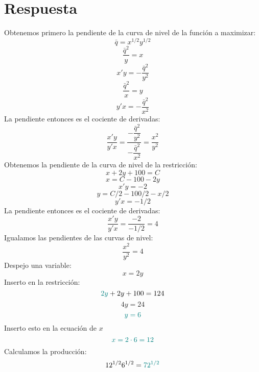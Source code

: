 \documentclass{article}
\begin{document}
\section*{Respuesta}
Obtenemos primero la pendiente de la curva de nivel de la función a maximizar:
\begin{equation*}
\bar{q}=x^{1/2}y^{1/2}
\end{equation*}
\begin{equation*}
\dfrac{\bar{q}^2}{y}=x
\end{equation*}
\begin{equation*}
x'y= -\dfrac{\bar{q}^2}{y^2}
\end{equation*}
\begin{equation*}
\dfrac{\bar{q}^2}{x}=y
\end{equation*}
\begin{equation*}
y'x= -\dfrac{\bar{q}^2}{x^2}
\end{equation*}
La pendiente entonces es el cociente de derivadas:
\begin{equation*}
\dfrac{x'y}{y'x}=\dfrac{-\dfrac{\bar{q}^2}{y^2}}{ -\dfrac{\bar{q}^2}{x^2}}=\dfrac{x^2}{y^2}
\end{equation*}
Obtenemos la pendiente de la curva de nivel de la restricción:
\begin{equation*}
x+2y+100=C
\end{equation*}
\begin{equation*}
x=C-100-2y
\end{equation*}
\begin{equation*}
x'y=-2
\end{equation*}
\begin{equation*}
y=C/2-100/2-x/2
\end{equation*}
\begin{equation*}
y'x=-1/2
\end{equation*}
La pendiente entonces es el cociente de derivadas:
\begin{equation*}
\dfrac{x'y}{y'x}=\dfrac{-2}{-1/2}=4
\end{equation*}
Igualamos las pendientes de las curvas de nivel:
\begin{equation*}
\dfrac{x^2}{y^2}=4
\end{equation*}
Despejo una variable:
\begin{equation*}
x=2y
\end{equation*}
Inserto en la restricción:
\begin{equation*}
{\color{teal} 2y}+2y+100=124
\end{equation*}
\begin{equation*}
4y=24
\end{equation*}
\begin{equation*}
\color{teal}y=6
\end{equation*}
Inserto esto en la ecuación de $x$
\begin{equation*}\color{teal}
x=2 \cdot{\color{teal} 6}=12
\end{equation*}
Calculamos la producción:
\begin{equation*}
12^{1/2}6^{1/2}= \color{teal} 72^{1/2}
\end{equation*}
\end{document}
